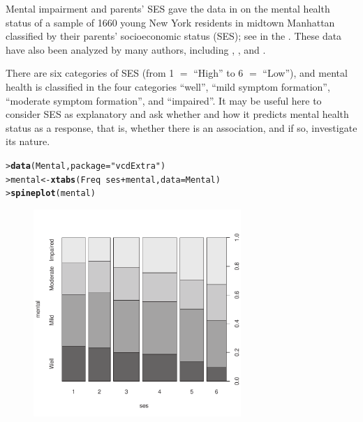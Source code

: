 \documentclass[10pt,krantz2]{krantz}\usepackage[]{graphicx}\usepackage[]{color}
\makeatletter
\newcommand{\hlstr}[1]{\textcolor[rgb]{0.192,0.494,0.8}{#1}}%
\newcommand{\hlopt}[1]{\textcolor[rgb]{0,0,0}{#1}}%
\newcommand{\hlstd}[1]{\textcolor[rgb]{0.345,0.345,0.345}{#1}}%
\newcommand{\hlkwb}[1]{\textcolor[rgb]{0.69,0.353,0.396}{#1}}%
\newcommand{\hlkwc}[1]{\textcolor[rgb]{0.333,0.667,0.333}{#1}}%
\newcommand{\hlkwd}[1]{\textcolor[rgb]{0.737,0.353,0.396}{\textbf{#1}}}%
\newenvironment{kframe}{%
 \def\at@end@of@kframe{}%
 \ifinner\ifhmode%
  \def\at@end@of@kframe{\end{minipage}}%
  \begin{minipage}{\columnwidth}%
 \fi\fi%
 \def\FrameCommand##1{\hskip\@totalleftmargin \hskip-\fboxsep
 \colorbox{shadecolor}{##1}\hskip-\fboxsep
     \hskip-\linewidth \hskip-\@totalleftmargin \hskip\columnwidth}%
 \MakeFramed {\advance\hsize-\width
   \@totalleftmargin\z@ \linewidth\hsize
   \@setminipage}}%
 {\par\unskip\endMakeFramed%
 \at@end@of@kframe}
\newenvironment{knitrout}{}{} %
\renewenvironment{knitrout}{\small\renewcommand{\baselinestretch}{.85}}{} %
\makeatother
\begin{document}
\begin{Example}[mental1]{Mental impairment and parents' SES}
\citet[p. 289]{Srole-etal:78} gave the data
in  on the mental
health status of a sample of 1660 young New York residents in midtown Manhattan
classified by their parents' socioeconomic status (SES);
see  in the .
These data have also been analyzed by many authors, including
\citet[ \S 10.5.3]{Agresti:2013},
\citet{Goodman:79}, and
\citet[p. 375]{Haberman:79}.

There are six categories of SES (from 1 $=$ ``High'' to 6 $=$ ``Low''), and mental health is classified
in the four categories ``well'', ``mild symptom formation'',
``moderate symptom formation'', and ``impaired''.
It may be useful here to consider SES as explanatory
and ask whether and how it predicts mental health status as
a response, that is, whether there is an association, and if so, investigate
its nature.

\begin{knitrout}
\color{fgcolor}\begin{kframe}
\begin{alltt}
\hlstd{> }\hlkwd{data}\hlstd{(Mental,} \hlkwc{package} \hlstd{=} \hlstr{"vcdExtra"}\hlstd{)}
\hlstd{> }\hlstd{mental} \hlkwb{<-} \hlkwd{xtabs}\hlstd{(Freq} \hlopt{~} \hlstd{ses} \hlopt{+} \hlstd{mental,} \hlkwc{data} \hlstd{= Mental)}
\hlstd{> }\hlkwd{spineplot}\hlstd{(mental)}
\end{alltt}
\end{kframe}\begin{figure}[!htbp]

\centerline{\includegraphics[width=0.7\textwidth]{ch04/fig/spineplot-1} }


\end{figure}
\end{knitrout}
\end{Example}
\end{document}
